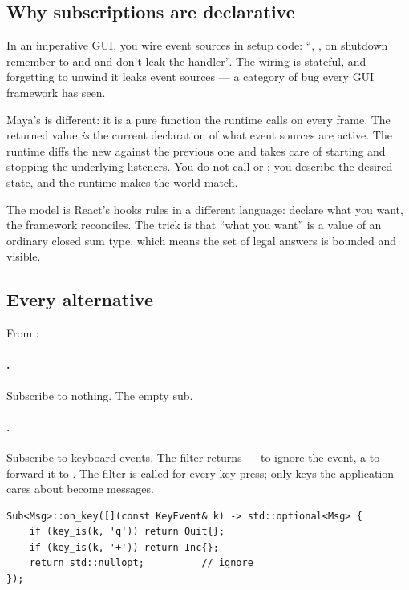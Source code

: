 \subsection{Why subscriptions are declarative}
\label{sec:elm:why-declarative}

In an imperative GUI, you wire event sources in setup code:
``, , on
shutdown remember to  and 
and don't leak the handler''. The wiring is stateful, and forgetting
to unwind it leaks event sources --- a category of bug every GUI
framework has seen.

Maya's  is different: it is a pure function the
runtime calls on every frame. The returned  value
\emph{is} the current declaration of what event sources are active.
The runtime diffs the new  against the previous one and
takes care of starting and stopping the underlying listeners. You
do not call  or ; you describe the desired
state, and the runtime makes the world match.

The model is React's hooks rules in a different language: declare
what you want, the framework reconciles. The trick is that ``what
you want'' is a value of an ordinary closed sum type, which means
the set of legal answers is bounded and visible.

\subsection{Every  alternative}
\label{sec:elm:sub-tour}

From :

\paragraph{.} Subscribe to nothing. The empty sub.

\paragraph{.} Subscribe to keyboard events. The filter
returns  ---  to ignore the
event, a  to forward it to . The filter is
called for every key press; only keys the application cares about
become messages.

\begin{lstlisting}
Sub<Msg>::on_key([](const KeyEvent& k) -> std::optional<Msg> {
    if (key_is(k, 'q')) return Quit{};
    if (key_is(k, '+')) return Inc{};
    return std::nullopt;          // ignore
});
\end{lstlisting}

